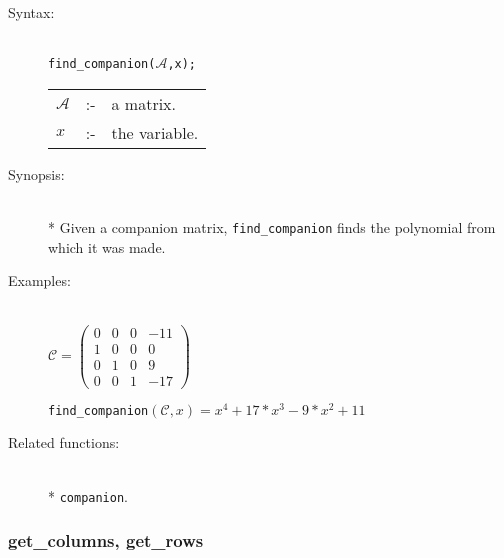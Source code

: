 \begin{description}
\item[Syntax:]\mbox{}\\
\texttt{find\_companion($\mathcal{A}$,x);}\\[2mm]
\begin{tabular}{l l l}
$\mathcal{A}$ &:-& a matrix. \\
$x$          &:-& the variable.
\end{tabular}

\item[Synopsis:]\mbox{}\\*
  Given a companion matrix, \texttt{find\_companion} finds the polynomial
from which it was made.

\item[Examples:]\mbox{}\\
  \(\mathcal{C} = \begin{pmatrix} 0 & 0 & 0 & -11 \\ 1 & 0 & 0 & 0
    \\ 0 & 1 & 0 & 9 \\ 0 & 0 & 1 & -17 \end{pmatrix}\)

  \texttt{find\_companion}\((\mathcal{C},x) = x^4+17*x^3-9*x^2+11\)

\item[Related functions:]\mbox{}\\*
\texttt{companion}.
\end{description}

\subsubsection{get\_columns, get\_rows}
\label{linalg:get_columns}
\hypertarget{operator:GET_COLUMNS}{}

